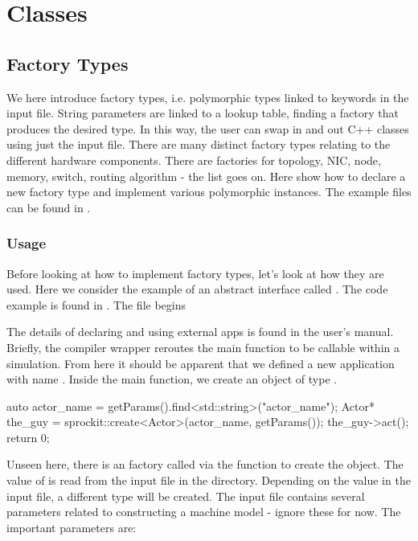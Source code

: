 
\chapter{\sstmacro Classes}\label{chapter:classes}

\section{Factory Types}\label{sec:factory}
We here introduce factory types, i.e. polymorphic types linked to keywords in the input file.
String parameters are linked to a lookup table, finding a factory that produces the desired type.
In this way, the user can swap in and out C++ classes using just the input file.
There are many distinct factory types relating to the different hardware components.
There are factories for topology, NIC, node, memory, switch, routing algorithm - the list goes on.
Here show how to declare a new factory type and implement various polymorphic instances.
The example files can be found in .

\subsection{Usage}\label{subsec:usage}
Before looking at how to implement factory types, let's look at how they are used.
Here we consider the example of an abstract interface called .
The code example is found in . The file begins

\begin{CppCode}
#include <sstmac/skeleton.h>
#include "actor.h"

namespace sstmac {
    namespace tutorial {

int main(int argc, char **argv)
{
\end{CppCode}
The details of declaring and using external apps is found in the user's manual.
Briefly, the \sstmacro compiler wrapper reroutes the main function to be callable within a simulation.
From here it should be apparent that we defined a new application with name .
Inside the main function, we create an object of type .

\begin{CppCode}
auto actor_name = getParams().find<std::string>("actor_name");
Actor* the_guy = sprockit::create<Actor>(actor_name, getParams());
the_guy->act();
return 0;
\end{CppCode}
Unseen here, there is an  factory called via the  function to create the object.
The value of  is read from the input file  in the directory.
Depending on the value in the input file, a different type will be created.
The input file contains several parameters related to constructing a machine model - ignore these for now.
The important parameters are:

